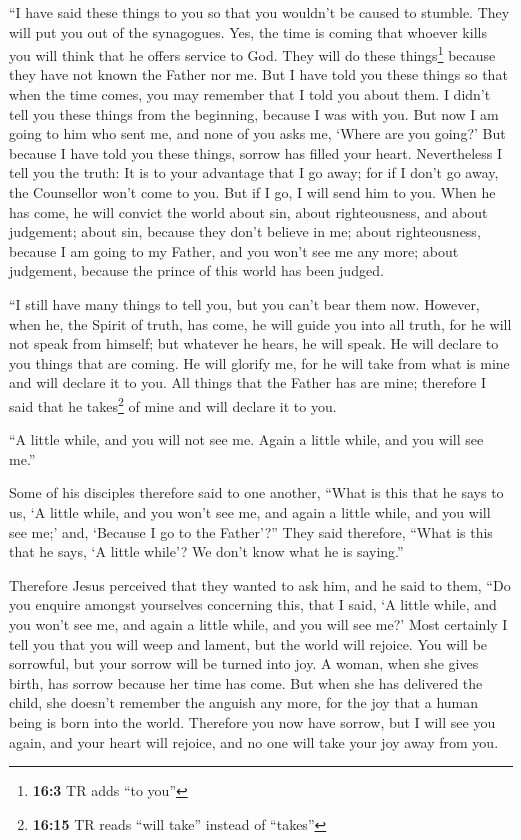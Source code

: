  ``I have said these things to you so that you wouldn't be
caused to stumble.  They will put you out of the
synagogues. Yes, the time is coming that whoever kills you will think
that he offers service to God.  They will do these
things\footnote{\textbf{16:3} TR adds ``to you''} because they have not
known the Father nor me.  But I have told you these things
so that when the time comes, you may remember that I told you about
them. I didn't tell you these things from the beginning, because I was
with you.  But now I am going to him who sent me, and none
of you asks me, `Where are you going?'  But because I have
told you these things, sorrow has filled your heart. 
Nevertheless I tell you the truth: It is to your advantage that I go
away; for if I don't go away, the Counsellor won't come to you. But if I
go, I will send him to you.  When he has come, he will
convict the world about sin, about righteousness, and about judgement;
 about sin, because they don't believe in me;
 about righteousness, because I am going to my Father,
and you won't see me any more;  about judgement, because
the prince of this world has been judged.

 ``I still have many things to tell you, but you can't
bear them now.  However, when he, the Spirit of truth,
has come, he will guide you into all truth, for he will not speak from
himself; but whatever he hears, he will speak. He will declare to you
things that are coming.  He will glorify me, for he will
take from what is mine and will declare it to you.  All
things that the Father has are mine; therefore I said that he
takes\footnote{\textbf{16:15} TR reads ``will take'' instead of
  ``takes''} of mine and will declare it to you.

 ``A little while, and you will not see me. Again a
little while, and you will see me.''

 Some of his disciples therefore said to one another,
``What is this that he says to us, `A little while, and you won't see
me, and again a little while, and you will see me;' and, `Because I go
to the Father'?''  They said therefore, ``What is this
that he says, `A little while'? We don't know what he is saying.''

 Therefore Jesus perceived that they wanted to ask him,
and he said to them, ``Do you enquire amongst yourselves concerning
this, that I said, `A little while, and you won't see me, and again a
little while, and you will see me?'  Most certainly I
tell you that you will weep and lament, but the world will rejoice. You
will be sorrowful, but your sorrow will be turned into joy.
 A woman, when she gives birth, has sorrow because her
time has come. But when she has delivered the child, she doesn't
remember the anguish any more, for the joy that a human being is born
into the world.  Therefore you now have sorrow, but I
will see you again, and your heart will rejoice, and no one will take
your joy away from you.

